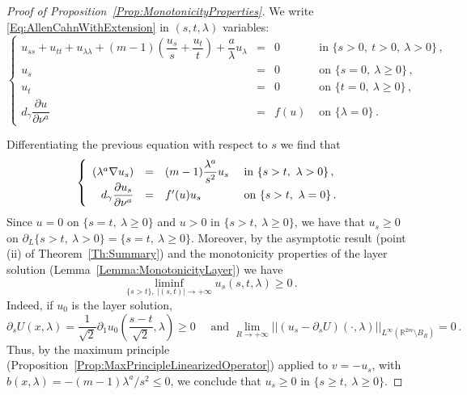 \documentclass[12pt,reqno]{amsart}
\theoremstyle{definition}
\theoremstyle{remark}
\newcommand{\con}[1]{\mathbb{#1}}
\newcommand{\R}{\con{R}} %
\newcommand{\norm}[1]{\left | \left |{#1} \right | \right |}
\newcommand{\s}{\gamma}
\newcommand{\bpar}[1]{\left ( {#1}\right )}
\newcommand\beqc[1]{\left\{\begin{array}{#1}}
\newcommand\eeqc{\end{array} \right.}
\def\PDEsystem{rcll}
\let\div\relax
\DeclareMathOperator{\div}{div}
\numberwithin{equation}{section}
\begin{document}
\begin{proof}[Proof of Proposition~\ref{Prop:MonotonicityProperties}]
We write \eqref{Eq:AllenCahnWithExtension} in $(s,t,\lambda)$ variables:
\begin{equation}
\label{Eq:AllenCahnEithExtensionST}
\beqc{\PDEsystem}
u_{ss} + u_{tt} + u_{\lambda \lambda} + (m-1)\bpar{\dfrac{u_s}{s} + \dfrac{u_t}{t}} + \dfrac{a}{\lambda} u_\lambda  & = & 0& \text{ in } \{s>0,\ t>0,\ \lambda > 0\}\,, \\
u_s & = & 0& \text{ on } \{s=0, \ \lambda \geq 0 \}\,, \\
u_t& = & 0& \text{ on } \{t=0, \ \lambda \geq 0 \}\,, \\
d_\s \dfrac{\partial u}{\partial \nu^a}& = & f(u)& \text{ on } \{\lambda = 0\}\,.
\eeqc
\end{equation}

Differentiating the previous equation with respect to $s$ we find that
$$
\beqc{\PDEsystem}
\div (\lambda^a \nabla u_s) &=& (m-1) \dfrac{\lambda^a}{s^2}u_s & \text{ in } \{s>t,\ \lambda > 0\}\,, \\
d_\s \dfrac{\partial u_s}{\partial \nu^a}& = & f'(u)u_s& \text{ on } \{s>t,\ \lambda = 0\}\,.
\eeqc
$$
Since $u = 0$ on $\{s = t,\ \lambda \geq 0 \}$ and $u>0$ in $\{s > t,\ \lambda \geq 0 \}$, we have that $u_s \geq 0$ on $\partial_L \{s>t,\ \lambda > 0 \} =\{s = t,\ \lambda \geq 0 \}$. Moreover, by the asymptotic result (point (ii) of Theorem~\ref{Th:Summary}) and the monotonicity properties of the layer solution (Lemma~\ref{Lemma:MonotonicityLayer}) we have
$$
\liminf_{\{s>t\} ,\ |(s,t)|\to +\infty} u_s(s,t,\lambda) \geq 0\,.
$$
Indeed, if $u_0$ is the layer solution, 
$$
\partial_s U (x,\lambda) = \dfrac{1}{\sqrt{2}} \partial_1 u_0\bpar{\dfrac{s-t}{\sqrt{2}}, \lambda} \geq 0 \quad \text{ and } \lim_{R\to +\infty} \norm{(u_s- \partial_s U)(\cdot,\lambda)}_{L^\infty(\R^{2m}\setminus B_{R})} = 0\,.
$$
Thus, by the maximum principle (Proposition~\ref{Prop:MaxPrincipleLinearizedOperator}) applied to $v=-u_s$, with $b(x,\lambda) = -(m-1)\lambda^a / s^2\leq 0$, we conclude that $u_s \geq 0$ in $\{s \geq t,\ \lambda \geq 0\}$.


\end{proof}
\end{document}
